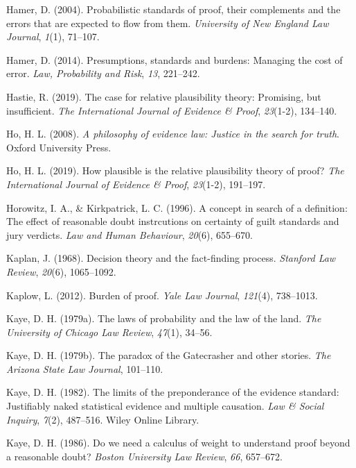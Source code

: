 \documentclass[10pt,dvipsnames]{scrartcl}
\begin{document}
\hypertarget{ref-hamer2004}{}
Hamer, D. (2004). Probabilistic standards of proof, their complements
and the errors that are expected to flow from them. \emph{University of
New England Law Journal}, \emph{1}(1), 71--107.

\hypertarget{ref-hamer2014}{}
Hamer, D. (2014). Presumptions, standards and burdens: Managing the cost
of error. \emph{Law, Probability and Risk}, \emph{13}, 221--242.

\hypertarget{ref-hastie2019CaseRelativePlausibilitya}{}
Hastie, R. (2019). The case for relative plausibility theory: Promising,
but insufficient. \emph{The International Journal of Evidence \& Proof},
\emph{23}(1-2), 134--140.

\hypertarget{ref-ho2008philosophy}{}
Ho, H. L. (2008). \emph{A philosophy of evidence law: Justice in the
search for truth}. Oxford University Press.

\hypertarget{ref-lai2019HowPlausibleRelative}{}
Ho, H. L. (2019). How plausible is the relative plausibility theory of
proof? \emph{The International Journal of Evidence \& Proof},
\emph{23}(1-2), 191--197.

\hypertarget{ref-Horowitz1996}{}
Horowitz, I. A., \& Kirkpatrick, L. C. (1996). A concept in search of a
definition: The effect of reasonable doubt instrcutions on certainty of
guilt standards and jury verdicts. \emph{Law and Human Behaviour},
\emph{20}(6), 655--670.

\hypertarget{ref-Kaplan1968decision}{}
Kaplan, J. (1968). Decision theory and the fact-finding process.
\emph{Stanford Law Review}, \emph{20}(6), 1065--1092.

\hypertarget{ref-kaplow2012}{}
Kaplow, L. (2012). Burden of proof. \emph{Yale Law Journal},
\emph{121}(4), 738--1013.

\hypertarget{ref-kaye79}{}
Kaye, D. H. (1979a). The laws of probability and the law of the land.
\emph{The University of Chicago Law Review}, \emph{47}(1), 34--56.

\hypertarget{ref-Kaye79gate}{}
Kaye, D. H. (1979b). The paradox of the Gatecrasher and other stories.
\emph{The Arizona State Law Journal}, 101--110.

\hypertarget{ref-kaye1982limits}{}
Kaye, D. H. (1982). The limits of the preponderance of the evidence
standard: Justifiably naked statistical evidence and multiple causation.
\emph{Law \& Social Inquiry}, \emph{7}(2), 487--516. Wiley Online
Library.

\hypertarget{ref-Kaye1986Do}{}
Kaye, D. H. (1986). Do we need a calculus of weight to understand proof
beyond a reasonable doubt? \emph{Boston University Law Review},
\emph{66}, 657--672.
\end{document}
